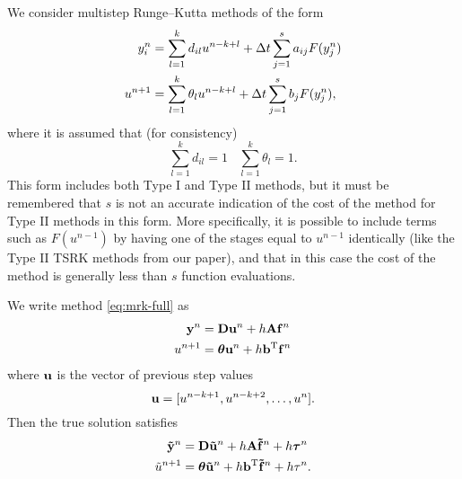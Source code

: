 We consider multistep Runge--Kutta methods of the form
\begin{subequations} \label{eq:mrk-full}
\begin{align}
y_i^n & = \sum_{l=1}^{k} d_{il} u^{n-k+l} + \Delta t\sum_{j=1}^s a_{ij} F(y_j^n) \\
u^{n+1} & = \sum_{l=1}^{k} \theta_l u^{n-k+l} + \Delta t\sum_{j=1}^s b_j F(y_j^n),
\end{align}
\end{subequations}
where it is assumed that (for consistency)
$$\sum_{l=1}^k d_{il} = 1 \ \ \ \ \sum_{l=1}^k \theta_l = 1.$$
This form includes both Type I and Type II methods, but it must be remembered
that $s$ is not an accurate indication of the cost of the method for
Type II methods in this form.  More specifically,
it is possible to include terms such as $F(u^{n-1})$ by having
one of the stages equal to $u^{n-1}$ identically (like the Type II TSRK
methods from our paper), and that in this
case the cost of the method is generally less than $s$ function 
evaluations.

We write method \eqref{eq:mrk-full} as
\begin{subequations} \label{eq:mrk}
\begin{align} 
\mathbf{y}^n & = \mathbf{D} \mathbf{u}^n + h \mathbf{A} \mathbf{f}^n \\
u^{n+1} & = \boldsymbol{\theta} \mathbf{u}^n + h \mathbf{b}^\mathrm{T} \mathbf{f}^n
\end{align}
\end{subequations}
where $\mathbf{u}$ is the vector of previous step values 
$$\mathbf{u} = [u^{n-k+1}, u^{n-k+2},\dots, u^{n}].$$
Then the true solution satisfies
\begin{subequations} \label{eq:mrk_lte}
\begin{align} 
\mathbf{\tilde{y}}^n & = \mathbf{D} \mathbf{\tilde{u}}^n + h \mathbf{A} \mathbf{\tilde{f}}^n + h \boldsymbol{\tau}^n \\
\tilde{u}^{n+1} & = \boldsymbol{\theta} \mathbf{\tilde{u}}^n + h \mathbf{b}^\mathrm{T}\mathbf{\tilde{f}}^n + h \tau^n.
\end{align}
\end{subequations}

